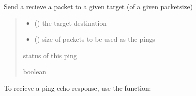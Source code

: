 \documentclass[letterpaper,10pt,english,openany,oneside]{sphinxmanual}
\begin{document}
\begin{fulllineitems}
\label{\detokenize{index:my_ping.send_ping}}
\pysigstartsignatures
\pysiglinewithargsret
{}
{\sphinxparamcomma {}}
{}
\pysigstopsignatures
\sphinxAtStartPar
Send a recieve a packet to a given target (of a given packetsize)
\begin{quote}\begin{description}
\begin{itemize}
\item {} 
\sphinxAtStartPar
{} () \textendash{} the target destination

\item {} 
\sphinxAtStartPar
{} () \textendash{} size of packets to be used as the pings

\end{itemize}

\sphinxAtStartPar
status of this ping

\sphinxAtStartPar
boolean

\end{description}\end{quote}

\end{fulllineitems}


\sphinxAtStartPar
To recieve a ping echo response, use the  function:
\end{document}
